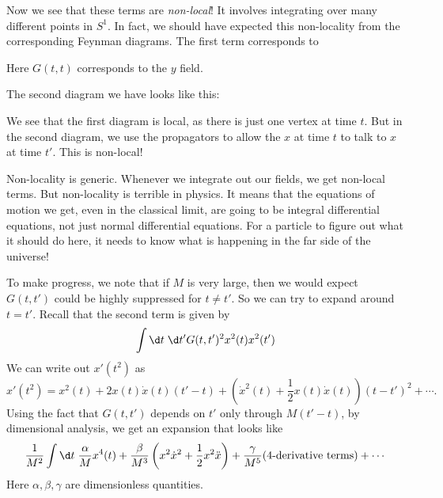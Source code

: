 \documentclass[a4paper]{article}
\begin{document}
Now we see that these terms are \emph{non-local}! It involves integrating over many different points in $S^1$. In fact, we should have expected this non-locality from the corresponding Feynman diagrams. The first term corresponds to
\begin{center}
\end{center}
Here $G(t, t)$ corresponds to the $y$ field.

The second diagram we have looks like this:
\begin{center}
\end{center}
We see that the first diagram is local, as there is just one vertex at time $t$. But in the second diagram, we use the propagators to allow the $x$ at time $t$ to talk to $x$ at time $t'$. This is non-local!

Non-locality is generic. Whenever we integrate out our fields, we get non-local terms. But non-locality is terrible in physics. It means that the equations of motion we get, even in the classical limit, are going to be integral differential equations, not just normal differential equations. For a particle to figure out what it should do here, it needs to know what is happening in the far side of the universe!

To make progress, we note that if $M$ is very large, then we would expect $G(t, t')$ could be highly suppressed for $t \not= t'$. So we can try to expand around $t = t'$. Recall that the second term is given by
\[
  \int \d t\; \d t' G(t, t')^2 x^2(t) x^2(t')
\]
We can write out $x'(t^2)$ as
\[
  x'(t^2) = x^2 (t) + 2x(t) \dot{x}(t) (t' - t) + \left(\dot{x}^2(t) + \frac{1}{2} x(t) \dot{x}(t)\right) (t - t')^2 + \cdots.
\]
Using the fact that $G(t, t')$ depends on $t'$ only through $M(t' - t)$, by dimensional analysis, we get an expansion that looks like
\[
  \frac{1}{M^2} \int \d t\; \frac{\alpha}{M} x^4(t) + \frac{\beta}{M^3} \left(x^2 \dot{x}^2 + \frac{1}{2} x^2 \ddot{x}\right) + \frac{\gamma}{M^5} (\text{4-derivative terms}) + \cdots
\]
Here $\alpha, \beta, \gamma$ are dimensionless quantities.
\end{document}
